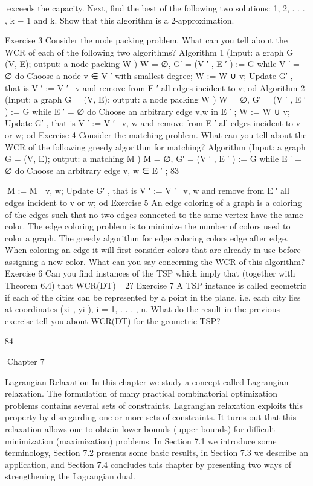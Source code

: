 \documentclass[titlepage]{book}
\theoremstyle{plain}
\theoremstyle{definition}
\theoremstyle{remark}
\begin{document}
exceeds the capacity. Next, find the best of the following two solutions: {1, 2, . . . , k − 1} and {k}.
Show that this algorithm is a 2-approximation.

Exercise 3
Consider the node packing problem. What can you tell about the WCR of each of the following two
algorithms?
Algorithm 1 (Input: a graph G = (V, E); output: a node packing W )
W = ∅, G′ = (V ′ , E ′ ) := G
while V ′ = ∅
do
Choose a node v ∈ V ′ with smallest degree;
W := W ∪ {v};
Update G′ , that is V ′ := V ′ \ {v} and remove from E ′ all edges incident to v;
od
Algorithm 2 (Input: a graph G = (V, E); output: a node packing W )
W = ∅, G′ = (V ′ , E ′ ) := G
while E ′ = ∅
do
Choose an arbitrary edge {v,w} in E ′ ;
W := W ∪ {v};
Update G′ , that is V ′ := V ′ \ {v, w} and remove from E ′ all edges incident to v or w;
od
Exercise 4
Consider the matching problem. What can you tell about the WCR of the following greedy algorithm
for matching?
Algorithm (Input: a graph G = (V, E); output: a matching M )
M = ∅, G′ = (V ′ , E ′ ) := G
while E ′ = ∅
do
Choose an arbitrary edge {v, w} ∈ E ′ ;
83

M := M ∪ {v, w};
Update G′ , that is V ′ := V ′ \ {v, w} and remove from E ′ all edges incident to v or w;
od
Exercise 5
An edge coloring of a graph is a coloring of the edges such that no two edges connected to the same
vertex have the same color. The edge coloring problem is to minimize the number of colors used to color
a graph. The greedy algorithm for edge coloring colors edge after edge. When coloring an edge it will
first consider colors that are already in use before assigning a new color. What can you say concerning
the WCR of this algorithm?
Exercise 6
Can you find instances of the TSP which imply that (together with Theorem 6.4) that WCR(DT)= 2?
Exercise 7
A TSP instance is called geometric if each of the cities can be represented by a point in the plane, i.e.
each city lies at coordinates (xi , yi ), i = 1, . . . , n. What do the result in the previous exercise tell you
about WCR(DT) for the geometric TSP?

84

Chapter 7

Lagrangian Relaxation
In this chapter we study a concept called Lagrangian relaxation. The formulation of many practical
combinatorial optimization problems contains several sets of constraints. Lagrangian relaxation exploits
this property by disregarding one or more sets of constraints. It turns out that this relaxation allows
one to obtain lower bounds (upper bounds) for difficult minimization (maximization) problems. In
Section 7.1 we introduce some terminology, Section 7.2 presents some basic results, in Section 7.3 we
describe an application, and Section 7.4 concludes this chapter by presenting two ways of strengthening
the Lagrangian dual.
\end{document}
